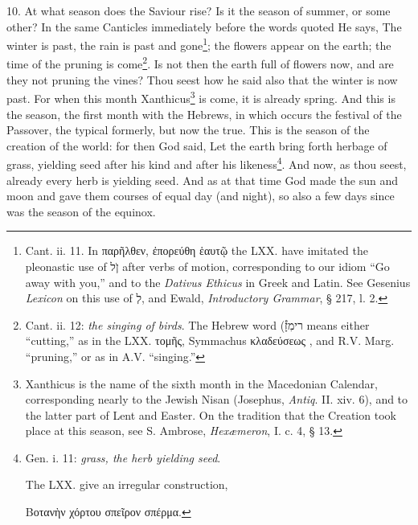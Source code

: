10. At what season does the Saviour rise? Is it the season of summer, or some other? In the same Canticles immediately before the words quoted He says, The winter is past, the rain is past and gone\footnote{Cant. ii. 11. In \textgreek{παρῆλθεν, ἐπορεύθη ἑαυτῷ} the \textsc{LXX.} have imitated the pleonastic use of \texthebrew{ן\texthebrew{ֹל}} after verbs of motion, corresponding to our idiom “Go away with you,” and to the \emph{Dativus Ethicus} in Greek and Latin. See Gesenius \emph{Lexicon} on this use of \texthebrew{ל\texthebrew{ְ}}, and Ewald, \emph{Introductory Grammar}, § 217, l. 2.}; the flowers appear on the earth; the time of the pruning is come\footnote{Cant. ii. 12: \emph{the singing of birds}. The Hebrew word (\texthebrew{ר\texthebrew{ימִזָ֯}} means either “cutting,” as in the \textsc{LXX}. \textgreek{τομῆς}, Symmachus \textgreek{κλαδεύσεως} , and \textsc{R.V.} Marg. “pruning,” or as in \textsc{A.V.} “singing.”}. Is not then the earth full of flowers now, and are they not pruning the vines? Thou seest how he said also that the winter is now past. For when this month Xanthicus\footnote{Xanthicus is the name of the sixth month in the Macedonian Calendar, corresponding nearly to the Jewish Nisan (Josephus, \emph{Antiq}. II. xiv. 6), and to the latter part of Lent and Easter. On the tradition that the Creation took place at this season, see S. Ambrose, \emph{Hexæmeron}, I. c. 4, § 13.} is come, it is already spring. And this is the season, the first month with the Hebrews, in which occurs the festival of the Passover, the typical formerly, but now the true. This is the season of the creation of the world: for then God said, Let the earth bring forth herbage of grass, yielding seed after his kind and after his likeness\footnote{Gen. i. 11: \emph{grass, the herb yielding seed}. \par The \textsc{LXX.} give an irregular construction, \par \textgreek{Βοτανὴν χόρτου σπεῖρον σπέρμα}.}. And now, as thou seest, already every herb is yielding seed. And as at that time God made the sun and moon and gave them courses of equal day (and night), so also a few days since was the season of the equinox.


